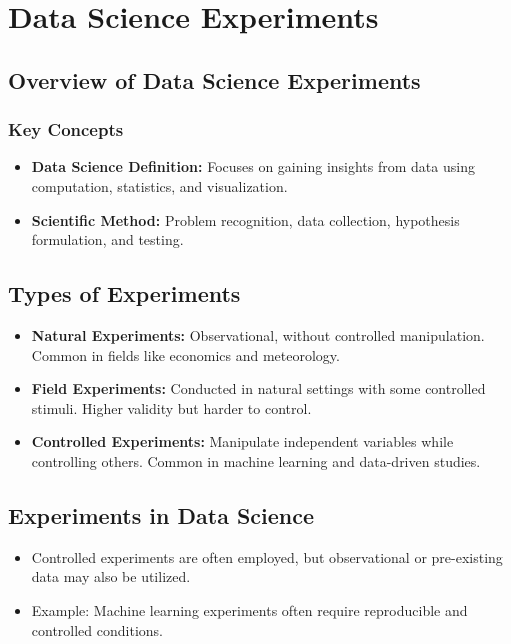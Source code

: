\section{Data Science Experiments}

\subsection{Overview of Data Science Experiments}
\subsubsection{Key Concepts}
\begin{itemize}
    \item \textbf{Data Science Definition:} Focuses on gaining insights from data using computation, statistics, and visualization.
    \item \textbf{Scientific Method:} Problem recognition, data collection, hypothesis formulation, and testing.
\end{itemize}

\subsection{Types of Experiments}
\begin{itemize}
    \item \textbf{Natural Experiments:} Observational, without controlled manipulation. Common in fields like economics and meteorology.
    \item \textbf{Field Experiments:} Conducted in natural settings with some controlled stimuli. Higher validity but harder to control.
    \item \textbf{Controlled Experiments:} Manipulate independent variables while controlling others. Common in machine learning and data-driven studies.
\end{itemize}

\subsection{Experiments in Data Science}
\begin{itemize}
    \item Controlled experiments are often employed, but observational or pre-existing data may also be utilized.
    \item Example: Machine learning experiments often require reproducible and controlled conditions.
\end{itemize}

